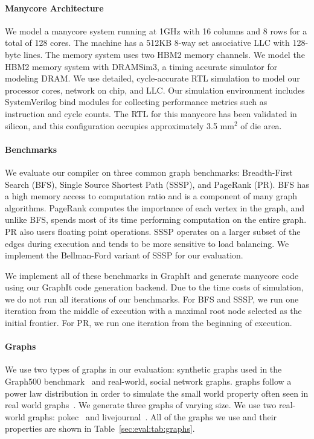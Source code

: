 \paragraph{Manycore Architecture}
We model a manycore system running at 1GHz with 16 columns and 8 rows for a total of 128 cores.
The machine has a 512KB 8-way set associative LLC with 128-byte lines.
The memory system uses two HBM2 memory channels.
We model the HBM2 memory system with DRAMSim3\cite{li2019dramsim3},  a timing accurate simulator for modeling DRAM.
We use detailed, cycle-accurate RTL simulation to model our processor cores, network on chip, and LLC.
Our simulation environment includes SystemVerilog bind modules for collecting performance metrics such as instruction and cycle counts.
The RTL for this manycore has been validated in silicon, and this configuration occupies approximately 3.5 mm$^2$ of die area. 

\tabHBParams

\paragraph{Benchmarks} We evaluate our compiler on three common graph benchmarks: Breadth-First Search (BFS), Single Source Shortest Path (SSSP), and PageRank (PR). 
BFS has a high memory access to computation ratio and is a component of many graph algorithms.
PageRank computes the importance of each vertex in the graph, and unlike BFS, spends most of its time performing computation on the entire graph.
PR also users floating point operations.
SSSP operates on a larger subset of the edges during execution and tends to be more sensitive to load balancing.
We implement the Bellman-Ford variant of SSSP for our evaluation.

We implement all of these benchmarks in GraphIt and generate manycore code using our GraphIt code generation backend.
Due to the time costs of simulation, we do not run all iterations of our benchmarks. 
For BFS and SSSP, we run one iteration from the middle of execution with a maximal root node selected as the initial frontier.
For PR, we run one iteration from the beginning of execution.



\paragraph{Graphs} We use two types of graphs in our evaluation: synthetic \kron graphs used in the Graph500 benchmark~\cite{murphy2010graph500} and real-world, social network graphs.
\kron graphs follow a power law distribution in order to simulate the small world property often seen in real world graphs~\cite{leskovec2010kronecker}.
We generate three \kron graphs of varying size. 
We use two real-world graphs: pokec~\cite{pokec} and livejournal~\cite{lj}.
All of the graphs we use and their properties are shown in Table~\ref{sec:eval:tab:graphs}.


